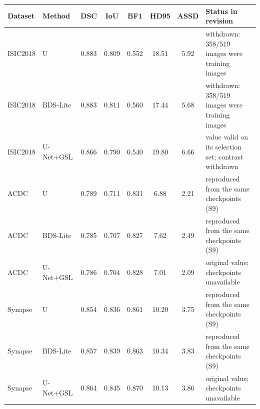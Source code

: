 \begin{tabular}{llcccccl}
\toprule
Dataset & Method & DSC & IoU & BF1 & HD95 & ASSD & Status in revision \\
\midrule
ISIC2018 & U & 0.883 & 0.809 & 0.552 & 18.51 & 5.92 & withdrawn: 358/519 images were training images \\
ISIC2018 & BDS-Lite & 0.883 & 0.811 & 0.560 & 17.44 & 5.68 & withdrawn: 358/519 images were training images \\
ISIC2018 & U-Net+GSL & 0.866 & 0.790 & 0.540 & 19.80 & 6.66 & value valid on its selection set; contrast withdrawn \\
ACDC & U & 0.789 & 0.711 & 0.831 & 6.88 & 2.21 & reproduced from the same checkpoints (S9) \\
ACDC & BDS-Lite & 0.785 & 0.707 & 0.827 & 7.62 & 2.49 & reproduced from the same checkpoints (S9) \\
ACDC & U-Net+GSL & 0.786 & 0.704 & 0.828 & 7.01 & 2.09 & original value; checkpoints unavailable \\
Synapse & U & 0.854 & 0.836 & 0.861 & 10.20 & 3.75 & reproduced from the same checkpoints (S9) \\
Synapse & BDS-Lite & 0.857 & 0.839 & 0.863 & 10.34 & 3.83 & reproduced from the same checkpoints (S9) \\
Synapse & U-Net+GSL & 0.864 & 0.845 & 0.870 & 10.13 & 3.86 & original value; checkpoints unavailable \\
\bottomrule
\end{tabular}

